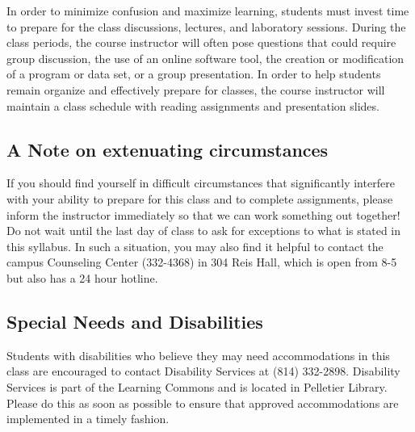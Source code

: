 \documentclass[11pt]{article} %
\begin{document}
 
% 
 In order to minimize confusion and maximize learning, students must invest time to prepare for the class discussions, lectures, and laboratory sessions. During the class periods, the course instructor will often pose questions that could require group discussion, the use of an online software tool, the creation or modification of a program or data set, or a group presentation.  In order to help students remain organize and effectively prepare for classes, the course instructor will maintain a class schedule with reading assignments and presentation slides.  


\subsection*{\textbf{A Note on extenuating circumstances}}
If you should find yourself in difficult circumstances that significantly interfere with your ability to prepare for this class and to complete assignments, please inform the instructor immediately so that we can work something out together! Do not wait until the last day of class to ask for exceptions to what is stated in this syllabus. In such a situation, you may also find it helpful to contact the campus Counseling Center (332-4368) in 304 Reis Hall, which is open from 8-5 but also has a 24 hour hotline.

\subsection*{\textbf{Special Needs and Disabilities}}
Students with disabilities who believe they may need accommodations in this class are encouraged to contact Disability Services at (814) 332-2898. Disability Services is part of the Learning Commons and is located in Pelletier Library. Please do this as soon as possible to ensure that approved accommodations are implemented in a timely fashion.
\end{document}
